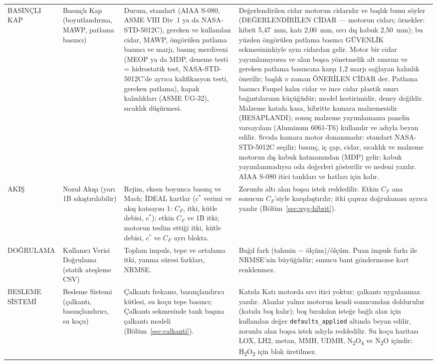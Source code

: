 \documentclass[11pt,a4paper]{article}
\newcommand{\ui}[1]{\textsf{#1}}
\newcommand{\kod}[1]{\texttt{#1}}
\begin{document}
\begin{longtable}{@{}>{\raggedright\arraybackslash}p{3.2cm}>{\raggedright\arraybackslash}p{3.6cm}>{\raggedright\arraybackslash}p{4.2cm}>{\raggedright\arraybackslash}p{4.6cm}@{}}
\ui{BASINÇLI KAP} & Basınçlı Kap (boyutlandırma, MAWP, patlama basıncı) & Durum, standart (AIAA S-080, ASME VIII Div~1 ya da NASA-STD-5012C), gereken ve kullanılan cidar, MAWP, öngörülen patlama basıncı ve marjı, basınç merdiveni (MEOP ya da MDP, deneme testi = hidrostatik test, NASA-STD-5012C'de ayrıca kalifikasyon testi, gereken patlama), kapak kalınlıkları (ASME UG-32), sıcaklık düşürmesi. & Değerlendirilen cidar motorun cidarıdır ve başlık bunu söyler (\ui{DEĞERLENDİRİLEN CİDAR --- motorun cidarı}; örnekler: hibrit 5,47~mm, katı 2,00~mm, sıvı dış kabuk 2,50~mm); bu yüzden öngörülen patlama basıncı \ui{GÜVENLİK} sekmesininkiyle aynı cidardan gelir. Motor bir cidar yayımlamıyorsa ve alan boşsa yönetmelik alt sınırını ve gereken patlama basıncına karşı 1,2 marjı sağlayan kalınlık önerilir; başlık o zaman \ui{ÖNERİLEN CİDAR} der. Patlama basıncı Faupel kalın cidar ve ince cidar plastik sınırı bağıntılarının küçüğüdür; model kestirimidir, deney değildir. Malzeme katıda kasa, hibritte kamara malzemesidir (\ui{HESAPLANDI}); sonuç malzeme yayımlamazsa panelin varsayılanı (Aluminum 6061-T6) kullanılır ve adıyla beyan edilir. Sıvıda kamara motor donanımıdır: standart NASA-STD-5012C seçilir; basınç, iç çap, cidar, sıcaklık ve malzeme motorun dış kabuk katmanından (MDP) gelir; kabuk yayımlanmadıysa oda değerleri gösterilir ve nedeni yazılır. AIAA S-080 itici tankları ve hatları için kalır. \\
\ui{AKIŞ} & Nozul Akışı (yarı 1B sıkıştırılabilir) & Rejim, eksen boyunca basınç ve Mach; \ui{İDEAL} kartlar ($c^*$ verimi ve akış katsayısı 1: $C_F$, itki, kütle debisi, $c^*$); etkin $C_F$ ve 1B itki; motorun teslim ettiği itki, kütle debisi, $c^*$ ve $C_F$ ayrı blokta. & Zorunlu altı alan boşsa istek reddedilir. Etkin $C_F$ ana sonucun $C_F$'siyle karşılaştırılır; itki çapraz doğrulaması ayrıca yazılır (Bölüm~\ref{sec:uyg-hibrit}). \\
\ui{DOĞRULAMA} & Kullanıcı Verisi Doğrulama (statik ateşleme CSV) & Toplam impuls, tepe ve ortalama itki, yanma süresi farkları, NRMSE. & Bağıl fark (tahmin $-$ ölçüm)/ölçüm. Puan impuls farkı ile NRMSE'nin büyüğüdür; sunucu bant göndermezse kart renklenmez. \\
\ui{BESLEME SİSTEMİ} & Besleme Sistemi (çalkantı, basınçlandırıcı, su koçu) & Çalkantı frekansı, basınçlandırıcı kütlesi, su koçu tepe basıncı; \ui{Çalkantı} sekmesinde tank başına çalkantı modeli (Bölüm~\ref{sec:calkanti}). & Katıda \ui{Katı motorda sıvı itici yoktur; çalkantı uygulanmaz.} yazılır. Alanlar yalnız motorun kendi sonucundan doldurulur (katıda boş kalır); boş bırakılan isteğe bağlı alan için kullanılan değer \kod{defaults\_\allowbreak{}applied} altında beyan edilir, zorunlu alan boşsa istek adıyla reddedilir. Su koçu haritası LOX, LH2, metan, MMH, UDMH, N\textsubscript{2}O\textsubscript{4} ve N\textsubscript{2}O içindir; H\textsubscript{2}O\textsubscript{2} için blok üretilmez. \\

\end{longtable}
\end{document}
